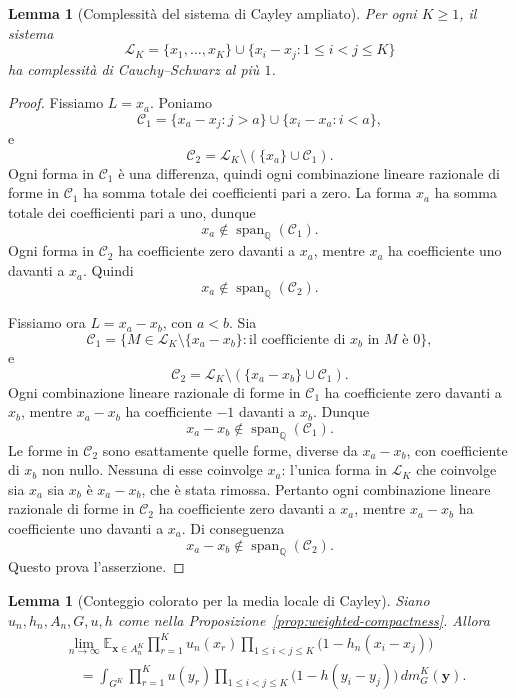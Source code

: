 \documentclass[11pt]{article}
\numberwithin{equation}{section}
\newtheorem{lemma}[theorem]{Lemma}
\newcommand{\E}{\mathbb E}
\newcommand{\1}{\mathbf 1}
\newcommand{\Span}{\operatorname{span}}
\begin{document}
\begin{lemma}[Complessità del sistema di Cayley ampliato]
\label{lem:cs-enlarged}
Per ogni \(K\ge1\), il sistema
\[
        \mathcal L_K
        =
        \{x_1,\ldots,x_K\}
        \cup
        \{x_i-x_j:1\le i<j\le K\}
\]
ha complessità di Cauchy--Schwarz al più \(1\).
\end{lemma}

\begin{proof}
Fissiamo \(L=x_a\). Poniamo
\[
        \mathcal C_1
        =
        \{x_a-x_j:j>a\}\cup\{x_i-x_a:i<a\},
\]
e
\[
        \mathcal C_2
        =
        \mathcal L_K\setminus(\{x_a\}\cup\mathcal C_1).
\]
Ogni forma in \(\mathcal C_1\) è una differenza, quindi ogni combinazione lineare razionale di forme in \(\mathcal C_1\) ha somma totale dei coefficienti pari a zero. La forma \(x_a\) ha somma totale dei coefficienti pari a uno, dunque
\[
        x_a\notin\Span_{\mathbb Q}(\mathcal C_1).
\]
Ogni forma in \(\mathcal C_2\) ha coefficiente zero davanti a \(x_a\), mentre \(x_a\) ha coefficiente uno davanti a \(x_a\). Quindi
\[
        x_a\notin\Span_{\mathbb Q}(\mathcal C_2).
\]

Fissiamo ora \(L=x_a-x_b\), con \(a<b\). Sia
\[
        \mathcal C_1
        =
        \{M\in\mathcal L_K\setminus\{x_a-x_b\}:
        \text{il coefficiente di }x_b\text{ in }M\text{ è }0\},
\]
e
\[
        \mathcal C_2
        =
        \mathcal L_K\setminus(\{x_a-x_b\}\cup\mathcal C_1).
\]
Ogni combinazione lineare razionale di forme in \(\mathcal C_1\) ha coefficiente zero davanti a \(x_b\), mentre \(x_a-x_b\) ha coefficiente \(-1\) davanti a \(x_b\). Dunque
\[
        x_a-x_b\notin\Span_{\mathbb Q}(\mathcal C_1).
\]
Le forme in \(\mathcal C_2\) sono esattamente quelle forme, diverse da \(x_a-x_b\), con coefficiente di \(x_b\) non nullo. Nessuna di esse coinvolge \(x_a\): l'unica forma in \(\mathcal L_K\) che coinvolge sia \(x_a\) sia \(x_b\) è \(x_a-x_b\), che è stata rimossa. Pertanto ogni combinazione lineare razionale di forme in \(\mathcal C_2\) ha coefficiente zero davanti a \(x_a\), mentre \(x_a-x_b\) ha coefficiente uno davanti a \(x_a\). Di conseguenza
\[
        x_a-x_b\notin\Span_{\mathbb Q}(\mathcal C_2).
\]
Questo prova l'asserzione.
\end{proof}

\begin{lemma}[Conteggio colorato per la media locale di Cayley]
\label{lem:cayley-coloured-counting}
Siano \(u_n,h_n,A_n,G,u,h\) come nella Proposizione~\ref{prop:weighted-compactness}. Allora
\[
\begin{aligned}
&\lim_{n\to\infty}
\E_{\mathbf x\in A_n^K}
        \prod_{r=1}^K u_n(x_r)
        \prod_{1\le i<j\le K}\bigl(1-h_n(x_i-x_j)\bigr) \\
&\quad =
\int_{G^K}
        \prod_{r=1}^K u(y_r)
        \prod_{1\le i<j\le K}\bigl(1-h(y_i-y_j)\bigr)
        \,dm_G^K(\mathbf y).
\end{aligned}
\]
\end{lemma}
\end{document}
